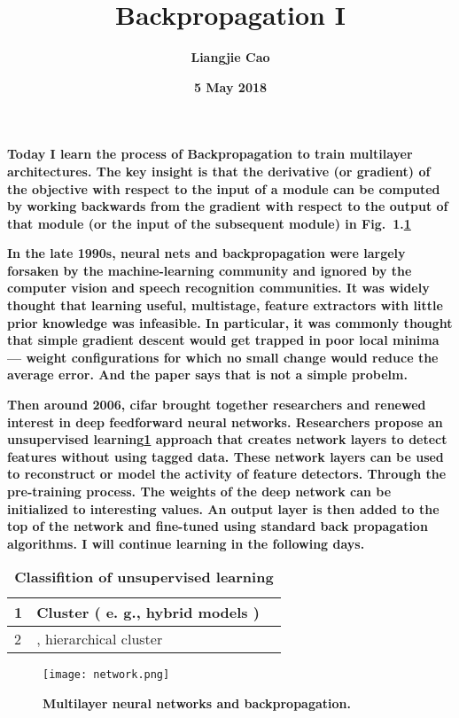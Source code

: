 \documentclass[25pt]{article}
\begin{document}
\title{\textbf{Backpropagation I}}
\author{\textbf{Liangjie Cao}}
\date{\textbf{5 May 2018}}
\maketitle
\par
\textbf{Today I learn the process of Backpropagation to train multilayer architectures. The key insight is that the derivative (or gradient) of the objective with respect to the input of a module can be computed by working backwards from the gradient with respect to the output of that module (or the input of the subsequent module) in Fig. 1.\ref{Figure}}\\
\par
\textbf{In the late 1990s, neural nets and backpropagation were largely forsaken by the machine-learning community and ignored by the computer vision and speech recognition communities. It was widely thought that learning useful, multistage, feature extractors with little prior knowledge was infeasible. In particular, it was commonly thought that simple gradient descent would get trapped in poor local minima — weight configurations for which no small change would reduce the average error. \cite{name1}And the paper says that is not a simple probelm.}
\\
\par
\textbf{Then around 2006, cifar brought together researchers and renewed interest in deep feedforward neural networks. Researchers propose an unsupervised learning\ref{Table} approach that creates network layers to detect features without using tagged data. These network layers can be used to reconstruct or model the activity of feature detectors. Through the pre-training process. The weights of the deep network can be initialized to interesting values. An output layer is then added to the top of the network and fine-tuned using standard back propagation algorithms. I will continue learning in the following days.}\\
\onecolumn
\begin{table}[!htbp]
  \centering
 \begin{tabular}{|p{3cm}|p{3cm}|p{3cm}}
   \hline
     1 & Cluster ( e. g., hybrid models )\\
  \hline
     2 & , hierarchical cluster\\
   \hline
  \end{tabular}
  \caption{\textbf{Classifition of unsupervised learning}} \label{Table}
  \end{table}
 \begin{figure}[ht]
 \centering
 \texttt{[image: network.png]}\\
 \caption{\textbf{ Multilayer neural networks and backpropagation.}}\label{Figure}
\end{figure}


\end{document}
